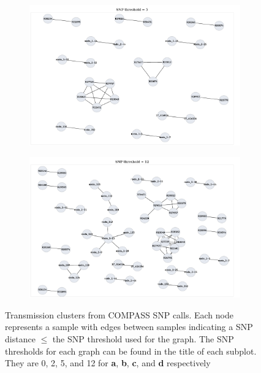 \begin{figure}
\begin{subfigure}[b]{0.45\textwidth}
     \end{subfigure}
     \begin{subfigure}[b]{0.45\textwidth}
         \centering
         \includegraphics[width=\textwidth]{Appendix1/Figs/compass_clusters_t5.png}
         \caption{}
     \end{subfigure}
     \hfill
     \begin{subfigure}[b]{0.45\textwidth}
         \centering
         \includegraphics[width=\textwidth]{Appendix1/Figs/compass_clusters_t12.png}
         \caption{}
     \end{subfigure}
        \caption{Transmission clusters from COMPASS SNP calls. Each node represents a sample with edges between samples indicating a SNP distance $\le$ the SNP threshold used for the graph. The SNP thresholds for each graph can be found in the title of each subplot. They are 0, 2, 5, and 12 for \textbf{a}, \textbf{b}, \textbf{c}, and \textbf{d} respectively}
        \label{fig:compass-original-clusters}
\end{figure}

